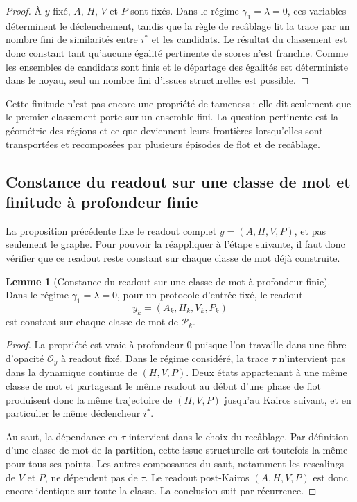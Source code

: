 \documentclass[11pt,a4paper]{article}
\theoremstyle{definition}
\newtheorem{lemma}[definition]{Lemme}
\theoremstyle{remark}
\begin{document}
\begin{proof}
À $y$ fixé, $A$, $H$, $V$ et $P$ sont fixés. Dans le régime $\gamma_1=\lambda=0$, ces variables déterminent le déclenchement, tandis que la règle de recâblage lit la trace par un nombre fini de similarités entre $i^*$ et les candidats. Le résultat du classement est donc constant tant qu'aucune égalité pertinente de scores n'est franchie. Comme les ensembles de candidats sont finis et le départage des égalités est déterministe dans le noyau, seul un nombre fini d'issues structurelles est possible.
\end{proof}

Cette finitude n'est pas encore une propriété de tameness : elle dit seulement que le premier classement porte sur un ensemble fini. La question pertinente est la géométrie des régions et ce que deviennent leurs frontières lorsqu'elles sont transportées et recomposées par plusieurs épisodes de flot et de recâblage.

\subsection{Constance du readout sur une classe de mot et finitude à profondeur finie}

La proposition précédente fixe le readout complet $y=(A,H,V,P)$, et pas seulement le graphe. Pour pouvoir la réappliquer à l'étape suivante, il faut donc vérifier que ce readout reste constant sur chaque classe de mot déjà construite.

\begin{lemma}[Constance du readout sur une classe de mot à profondeur finie]
Dans le régime $\gamma_1=\lambda=0$, pour un protocole d'entrée fixé, le readout
\[
y_k=(A_k,H_k,V_k,P_k)
\]
est constant sur chaque classe de mot de $\mathcal P_k$.
\end{lemma}

\begin{proof}
La propriété est vraie à profondeur $0$ puisque l'on travaille dans une fibre d'opacité $\mathcal O_y$ à readout fixé. Dans le régime considéré, la trace $\tau$ n'intervient pas dans la dynamique continue de $(H,V,P)$. Deux états appartenant à une même classe de mot et partageant le même readout au début d'une phase de flot produisent donc la même trajectoire de $(H,V,P)$ jusqu'au Kairos suivant, et en particulier le même déclencheur $i^*$.

Au saut, la dépendance en $\tau$ intervient dans le choix du recâblage. Par définition d'une classe de mot de la partition, cette issue structurelle est toutefois la même pour tous ses points. Les autres composantes du saut, notamment les rescalings de $V$ et $P$, ne dépendent pas de $\tau$. Le readout post-Kairos $(A,H,V,P)$ est donc encore identique sur toute la classe. La conclusion suit par récurrence.
\end{proof}
\end{document}
